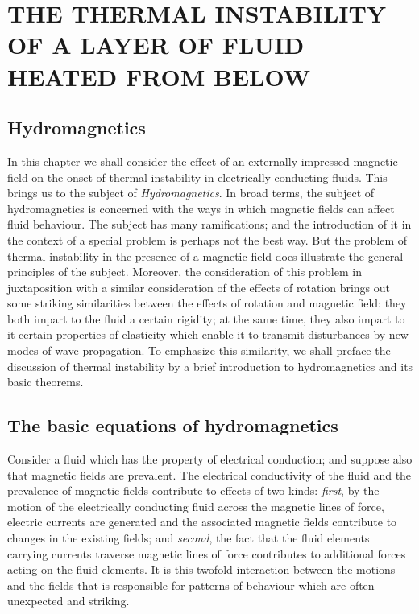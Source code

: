 \chapter{THE THERMAL INSTABILITY OF A LAYER OF FLUID HEATED FROM BELOW}
\label{ch:4}
\setcounter{section}{35}


\section{Hydromagnetics}\label{sec:36}

In this chapter we shall consider the effect of an externally impressed magnetic field on the onset of thermal instability in electrically conducting fluids. This brings us to the subject of \emph{Hydromagnetics}. In broad terms, the subject of hydromagnetics is concerned with the ways in which magnetic fields can affect fluid behaviour. The subject has many ramifications; and the introduction of it in the context of a special problem is perhaps not the best way. But the problem of thermal instability in the presence of a magnetic field does illustrate the general principles of the subject. Moreover, the consideration of this problem in juxtaposition with a similar consideration of the effects of rotation brings out some striking similarities between the effects of rotation and magnetic field: they both impart to the fluid a certain rigidity; at the same time, they also impart to it certain properties of elasticity which enable it to transmit disturbances by new modes of wave propagation. To emphasize this similarity, we shall preface the discussion of thermal instability by a brief introduction to hydromagnetics and its basic theorems.

\section{The basic equations of hydromagnetics}\label{sec:37}

Consider a fluid which has the property of electrical conduction; and suppose also that magnetic fields are prevalent. The electrical conductivity of the fluid and the prevalence of magnetic fields contribute to effects of two kinds: \emph{first}, by the motion of the electrically conducting fluid across the magnetic lines of force, electric currents are generated and the associated magnetic fields contribute to changes in the existing fields; and \emph{second}, the fact that the fluid elements carrying currents traverse magnetic lines of force contributes to additional forces acting on the fluid elements. It is this twofold interaction between the motions and the fields that is responsible for patterns of behaviour which are often unexpected and striking.

